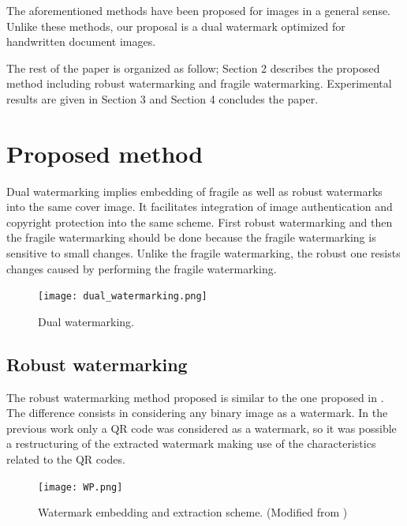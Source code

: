 \documentclass[runningheads]{llncs}
\begin{document}
The aforementioned methods have been proposed for images in a general sense. Unlike these methods, our proposal is a dual watermark optimized for handwritten document images. 

The rest of the paper is organized as follow; Section 2 describes the proposed method including robust watermarking and fragile watermarking. Experimental results are given in Section 3 and Section 4 concludes the paper.

\section{Proposed method}
Dual watermarking implies embedding of fragile as well as robust watermarks into the same cover image. It facilitates integration of image authentication and copyright protection into the same scheme. First robust watermarking and then the fragile watermarking should be done because the fragile watermarking is sensitive to small changes. Unlike the fragile watermarking, the robust one resists changes caused by performing the fragile watermarking.
\begin{figure}
	\begin{center}
		\texttt{[image: dual\_watermarking.png]}
		\caption{Dual watermarking.} \label{dual_watermarking}
	\end{center}
\end{figure}

\subsection{Robust watermarking}
The robust watermarking method proposed is similar to the one proposed in \cite{avila2018watermarking}. The difference consists in considering any binary image as a watermark. In the previous work only a QR code was considered as a watermark, so it was possible a restructuring of the extracted watermark making use of the characteristics related to the QR codes.
\begin{figure}
	\begin{center}
		\texttt{[image: WP.png]}
	\end{center}
	\caption{Watermark embedding and extraction scheme. (Modified from \cite{avila2018watermarking})}
	\label{PIE}
\end{figure}
\end{document}
